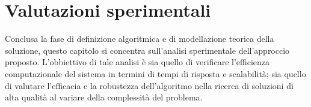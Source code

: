 \chapter{Valutazioni sperimentali}\label{cha:valutazioni_sperimentali}
Conclusa la fase di definizione algoritmica e di modellazione teorica della soluzione, questo capitolo si concentra sull'analisi sperimentale dell'approccio proposto.
L'obbiettivo di tale analisi è sia quello di verificare l'efficienza computazionale del sistema in termini di tempi di risposta e scalabilità; sia quello di valutare l'efficacia e la robustezza dell'algoritmo nella ricerca di soluzioni di alta qualità al variare della complessità del problema.











%